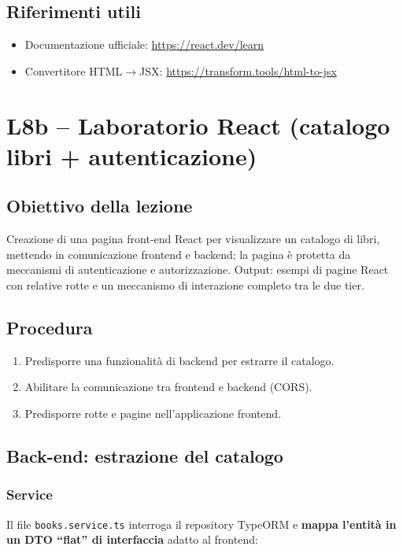 \documentclass[11pt,a4paper]{article}
\begin{document}
\subsection{Riferimenti utili}
\begin{itemize}[leftmargin=*]
    \item Documentazione ufficiale: \url{https://react.dev/learn}
    \item Convertitore HTML$\to$JSX: \url{https://transform.tools/html-to-jsx}
\end{itemize}

\section{L8b -- Laboratorio React (catalogo libri + autenticazione)}

\subsection{Obiettivo della lezione}

Creazione di una pagina front-end React per visualizzare un catalogo di libri, mettendo in comunicazione frontend e backend; la pagina \`e protetta da meccanismi di autenticazione e autorizzazione. Output: esempi di pagine React con relative rotte e un meccanismo di interazione completo tra le due tier.

\subsection{Procedura}

\begin{enumerate}[leftmargin=*]
    \item Predisporre una funzionalit\`a di backend per estrarre il catalogo.
    \item Abilitare la comunicazione tra frontend e backend (CORS).
    \item Predisporre rotte e pagine nell'applicazione frontend.
\end{enumerate}

\subsection{Back-end: estrazione del catalogo}

\subsubsection{Service}
Il file \texttt{books.service.ts} interroga il repository TypeORM e \textbf{mappa l'entit\`a in un DTO ``flat'' di interfaccia} adatto al frontend:
\end{document}
